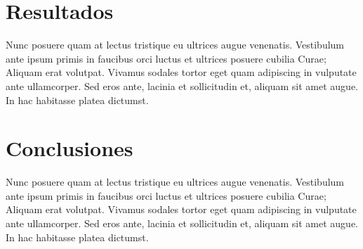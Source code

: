 \section{Resultados}

Nunc posuere quam at lectus tristique eu ultrices augue venenatis. Vestibulum ante ipsum primis in faucibus orci luctus et ultrices posuere cubilia Curae; Aliquam erat volutpat. Vivamus sodales tortor eget quam adipiscing in vulputate ante ullamcorper. Sed eros ante, lacinia et sollicitudin et, aliquam sit amet augue. In hac habitasse platea dictumst.

\section{Conclusiones}

Nunc posuere quam at lectus tristique eu ultrices augue venenatis. Vestibulum ante ipsum primis in faucibus orci luctus et ultrices posuere cubilia Curae; Aliquam erat volutpat. Vivamus sodales tortor eget quam adipiscing in vulputate ante ullamcorper. Sed eros ante, lacinia et sollicitudin et, aliquam sit amet augue. In hac habitasse platea dictumst.